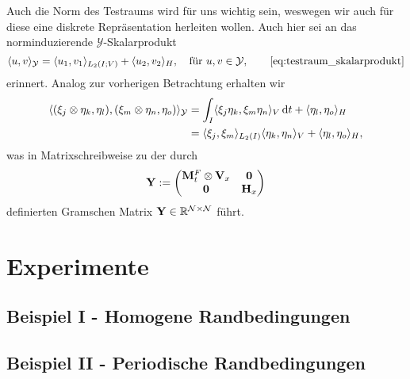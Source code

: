 \documentclass[../main.tex]{subfiles}
\begin{document}
Auch die Norm des Testraums wird für uns wichtig sein, weswegen wir auch für diese eine diskrete Repräsentation herleiten wollen.
Auch hier sei an das norminduzierende $\mathcal Y$-Skalarprodukt
\begin{equation}
    \skp{u}{v}{\mathcal Y} = \skp{u_{1}}{v_{1}}{L_2(I; V)} + \skp{u_{2}}{v_{2}}{H}, \quad \text{für } u, v \in \mathcal Y,
    \tag*{\cref{eq:testraum_skalarprodukt}}
\end{equation}
erinnert.
Analog zur vorherigen Betrachtung erhalten wir
\begin{align}
    \langle(\xi_{j} \otimes \eta_{k}, \eta_{l}),(\xi_{m} \otimes \eta_{n}, \eta_{o})\rangle_{\mathcal Y}
    &= \int_{I} \langle\xi_{j} \eta_{k},\xi_{m} \eta_{n}\rangle_{V} \mathop{}\!\mathrm{d} t + \langle\eta_{l},\eta_{o}\rangle_{H}
    \\&= \langle\xi_{j},\xi_{m}\rangle_{L_{2}(I)} \langle\eta_{k},\eta_{n}\rangle_{V} + \langle\eta_{l},\eta_{o}\rangle_{H},
\end{align}
was in Matrixschreibweise zu der durch
\begin{equation}
    \mathbf{Y} := \begin{pmatrix}
    \mathbf{M}_{t}^{F} \otimes \mathbf{V}_{x} & \mathbf{0}\\
    \mathbf{0} & \mathbf{H}_{x}
    \end{pmatrix}
\end{equation}
definierten Gramschen Matrix $\mathbf{Y} \in \mathbb{R}^{\mathcal N \times \mathcal N}$ führt.


\section{Experimente} %
\label{sec:experimente}

\subsection{Beispiel I - Homogene Randbedingungen} %
\label{sub:beispiel}


\subsection{Beispiel II - Periodische Randbedingungen} %
\label{sub:beispiel_ii_periodische_randbedingungen}


\end{document}
